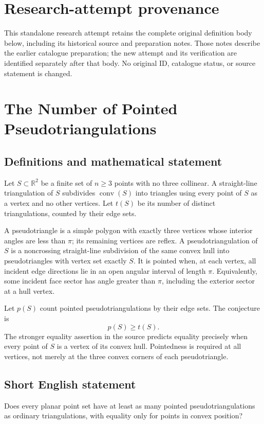 \documentclass[11pt,a4paper]{article}
\begin{document}
\section*{Research-attempt provenance}
This standalone research attempt retains the complete original definition body below,
including its historical source and preparation notes. Those notes describe the
earlier catalogue preparation; the new attempt and its verification are identified
separately after that body. No original ID, catalogue status, or source statement is changed.

\section*{The Number of Pointed Pseudotriangulations}\label{statement}

\subsection{Definitions and mathematical statement}
Let $S\subset\mathbb R^2$ be a finite set of $n\ge3$ points with no
three collinear. A straight-line triangulation of $S$ subdivides
$\operatorname{conv}(S)$ into triangles using every point of $S$ as
a vertex and no other vertices. Let $t(S)$ be its number of distinct
triangulations, counted by their edge sets.

A pseudotriangle is a simple polygon with exactly three vertices
whose interior angles are less than $\pi$; its remaining vertices
are reflex. A pseudotriangulation of $S$ is a noncrossing straight-line
subdivision of the same convex hull into pseudotriangles with vertex
set exactly $S$. It is pointed when, at each vertex, all incident
edge directions lie in an open angular interval of length $\pi$.
Equivalently, some incident face sector has angle greater than $\pi$,
including the exterior sector at a hull vertex.

Let $p(S)$ count pointed pseudotriangulations by their edge sets.
The conjecture is
\[
                            p(S)\ge t(S).
\]
The stronger equality assertion in the source predicts equality
precisely when every point of $S$ is a vertex of its convex hull.
Pointedness is required at all vertices, not merely at the three
convex corners of each pseudotriangle.
\subsection{Short English statement}
Does every planar point set have at least as many pointed
pseudotriangulations as ordinary triangulations, with equality only
for points in convex position?
\end{document}
